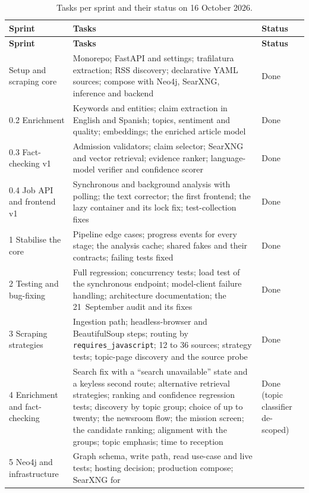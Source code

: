 {\small
\begin{longtable}{@{}p{2.6cm}p{9.4cm}p{1.6cm}@{}}
\caption{Tasks per sprint and their status on 16 October 2026.}
\label{tab:sprint-tasks} \\
\toprule
\textbf{Sprint} & \textbf{Tasks} & \textbf{Status} \\
\midrule
\endfirsthead
\toprule
\textbf{Sprint} & \textbf{Tasks} & \textbf{Status} \\
\midrule
\endhead
\bottomrule
\endfoot
0.1 Setup and scraping core & Monorepo; FastAPI and settings;
trafilatura extraction; RSS discovery; declarative YAML sources;
compose with Neo4j, SearXNG, inference and backend & Done \\
0.2 Enrichment & Keywords and entities; claim extraction in English and
Spanish; topics, sentiment and quality; embeddings; the enriched
article model & Done \\
0.3 Fact-checking v1 & Admission validators; claim selector; SearXNG
and vector retrieval; evidence ranker; language-model verifier and
confidence scorer & Done \\
0.4 Job API and frontend v1 & Synchronous and background analysis with
polling; the text corrector; the first frontend; the lazy container and
its lock fix; test-collection fixes & Done \\
1 Stabilise the core & Pipeline edge cases; progress events for every
stage; the analysis cache; shared fakes and their contracts; failing
tests fixed & Done \\
2 Testing and bug-fixing & Full regression; concurrency tests; load
test of the synchronous endpoint; model-client failure handling;
architecture documentation; the 21~September audit and its fixes &
Done \\
3 Scraping strategies & Ingestion path; headless-browser and
BeautifulSoup steps; routing by \texttt{requires\_javascript}; 12 to 36
sources; strategy tests; topic-page discovery and the source probe &
Done \\
4 Enrichment and fact-checking & Search fix with a ``search
unavailable'' state and a keyless second route; alternative retrieval
strategies; ranking and confidence regression tests; discovery by
topic group; choice of up to twenty; the newsroom flow; the mission
screen; the candidate ranking; alignment with the groups; topic
emphasis; time to reception & Done (topic classifier de-scoped) \\
5 Neo4j and infrastructure & Graph schema, write path, read use-case
and live tests; hosting decision; production compose; SearXNG for

\end{longtable}}
